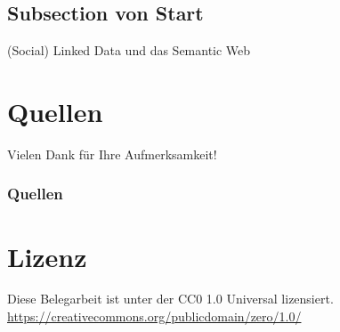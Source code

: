 \documentclass{beamer}              %
\begin{document}
\subsection{Subsection von Start}
\begin{frame}{}
   \centering (Social) Linked Data und das Semantic Web
\end{frame}


\section{Quellen}
\begin{frame}{}
   \centering Vielen Dank für Ihre Aufmerksamkeit!
\end{frame}

\begin{frame}[allowframebreaks]
        \frametitle{Quellen}
        
        
\end{frame}

\section{Lizenz}
\begin{frame}{}
   \centering Diese Belegarbeit ist unter der CC0 1.0 Universal lizensiert. \url{https://creativecommons.org/publicdomain/zero/1.0/}
\end{frame}
\end{document}
